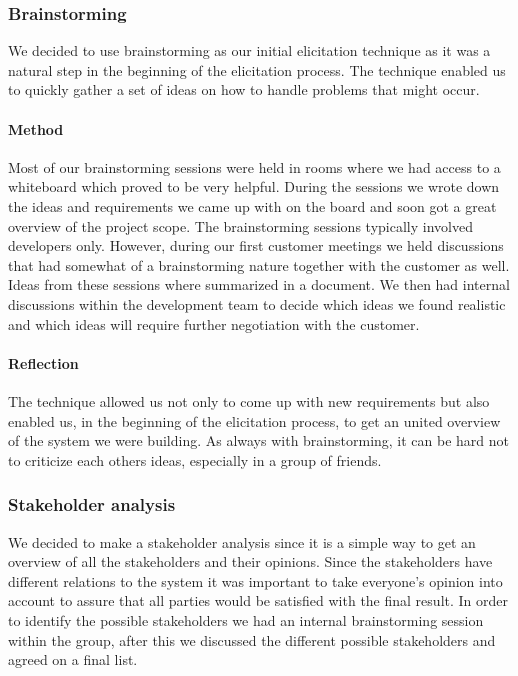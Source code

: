 \documentclass[10pt]{article}
\begin{document}
\subsubsection{Brainstorming}
We decided to use brainstorming as our initial elicitation technique as it was a natural step in the beginning of the elicitation process. The technique enabled us to quickly gather a set of ideas on how to handle problems that might occur.

\paragraph{Method}
\hfill \break
Most of our brainstorming sessions were held in rooms where we had access to a whiteboard which proved to be very helpful. During the sessions we wrote down the ideas and requirements we came up with on the board and soon got a great overview of the project scope. The brainstorming sessions typically involved developers only. However, during our first customer meetings we held discussions that had somewhat of a brainstorming nature together with the customer as well. Ideas from these sessions where summarized in a document. We then had internal discussions within the development team to decide which ideas we found realistic and which ideas will require further negotiation with the customer.
\paragraph{Reflection}
\hfill \break
The technique allowed us not only to come up with new requirements but also enabled us, in the beginning of the elicitation process, to get an united overview of the system we were building. As always with brainstorming, it can be hard not to criticize each others ideas, especially in a group of friends.

\subsubsection{Stakeholder analysis}
We decided to make a stakeholder analysis since it is a simple way to get an overview of all the stakeholders and their opinions. Since the stakeholders have different relations to the system it was important to take everyone's opinion into account to assure that all parties would be satisfied with the final result. In order to identify the possible stakeholders we had an internal brainstorming session within the group, after this we discussed the different possible stakeholders and agreed on a final list.
\end{document}
